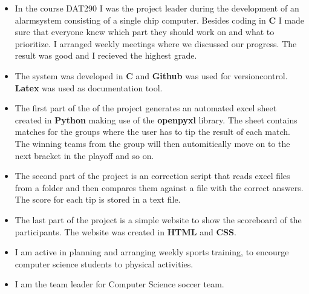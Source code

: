 \documentclass[10pt,a4paper,ragged2e]{altacv}
\begin{document}
\begin{fullwidth}

\begin{itemize}
  \item In the course DAT290 I was the project leader during the development of an alarmsystem 
  consisting of a single chip computer. Besides coding in \textbf{C} I made sure that everyone 
  knew which part they should work on and what to prioritize. I arranged weekly meetings where 
  we discussed our progress. The result was good and I recieved the highest grade.
  \item The system was developed in \textbf{C} and \textbf{Github} was used for versioncontrol.
  \textbf{Latex} was used as documentation tool.
   
\end{itemize}

\divider

\begin{itemize}
  \item The first part of the of the project generates an automated excel sheet created in \textbf{Python} 
  making use of the \textbf{openpyxl} library. The sheet contains matches for the groups where the user has 
  to tip the result of each match. The winning teams from the group will then automitically move on to the 
  next bracket in the playoff and so on.
  \item The second part of the project is an correction script that reads excel files from a folder and then
   compares them against a file with the correct answers. The score for each tip is stored in a text file.
  \item The last part of the project is a simple website to show the scoreboard of the participants. The 
  website was created in \textbf{HTML} and \textbf{CSS}.
\end{itemize}


\begin{itemize}
  \item I am active in planning and arranging weekly sports training, to encourge 
  computer science students to physical activities. 
  \item I am the team leader for Computer Science soccer team.
\end{itemize}


\end{fullwidth}
\end{document}
